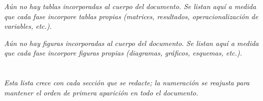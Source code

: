 \documentclass[12pt,letterpaper]{article}
\newcommand{\notaseccion}[1]{\begin{center}\itshape\footnotesize #1\end{center}}
\begin{document}


\tableofcontents
\newpage

\listoftables
\notaseccion{Aún no hay tablas incorporadas al cuerpo del documento. Se listan aquí a medida
que cada fase incorpore tablas propias (matrices, resultados, operacionalización de
variables, etc.).}
\newpage

\listoffigures
\notaseccion{Aún no hay figuras incorporadas al cuerpo del documento. Se listan aquí a medida
que cada fase incorpore figuras propias (diagramas, gráficos, esquemas, etc.).}
\newpage


\newpage

\newpage

\newpage

\newpage

\newpage

\newpage

\newpage

\newpage

\newpage

\newpage

\section*{}


\notaseccion{Esta lista crece con cada sección que se redacte; la numeración se reajusta
para mantener el orden de primera aparición en todo el documento.}
\newpage


\end{document}
